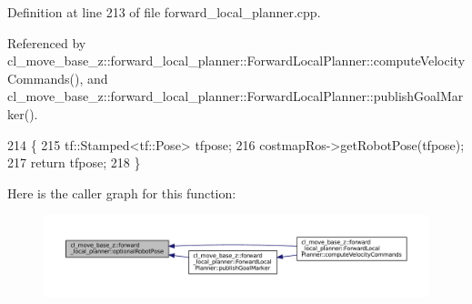 Definition at line 213 of file forward\+\_\+local\+\_\+planner.\+cpp.



Referenced by cl\+\_\+move\+\_\+base\+\_\+z\+::forward\+\_\+local\+\_\+planner\+::\+Forward\+Local\+Planner\+::compute\+Velocity\+Commands(), and cl\+\_\+move\+\_\+base\+\_\+z\+::forward\+\_\+local\+\_\+planner\+::\+Forward\+Local\+Planner\+::publish\+Goal\+Marker().


\begin{DoxyCode}
214 \{
215     tf::Stamped<tf::Pose> tfpose;
216     costmapRos->getRobotPose(tfpose);
217     \textcolor{keywordflow}{return} tfpose;
218 \}
\end{DoxyCode}
Here is the caller graph for this function\+:
\nopagebreak
\begin{figure}[H]
\begin{center}
\leavevmode
\includegraphics[width=350pt]{namespacecl__move__base__z_1_1forward__local__planner_a4c20f9fe0ca67779c53e90182baf4997_icgraph}
\end{center}
\end{figure}
